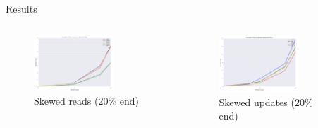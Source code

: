 \documentclass[pdf]{beamer}
\begin{document}
\begin{frame}{Results}
     \begin{columns}[T] %
     \begin{column}[T]{6cm} %
     \begin{center}
\begin{figure}[H]
\begin{center}
    \includegraphics[width=0.7\textwidth]{reads_skend}
    \caption{Skewed reads (20\% end)}
\end{center}
\end{figure}
	\end{center}
     \end{column}
          \begin{column}[T]{6cm} %
\begin{figure}[H]
\begin{center}
    \includegraphics[width=0.7\textwidth]{updates_skend}
    \caption{Skewed updates (20\% end)}
\end{center}
\end{figure}
    	\end{column}
     \end{columns}
\end{frame}
\end{document}
